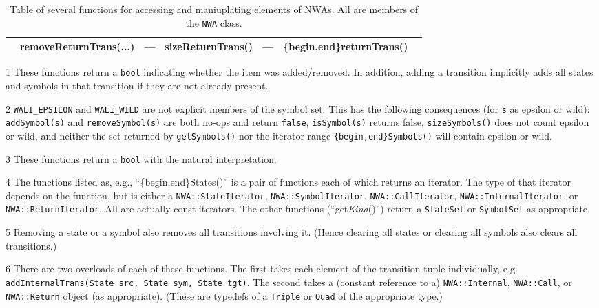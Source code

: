 \begin{sidewaystable}
\begin{threeparttable}
\begin{tabular}{p{0.75in}p{1.55in}p{1.6in}p{1.35in}p{1.27in}p{1.2in}p{1.5in}}
                                                            &  removeReturnTrans(\phantom{.}...\tnote{6}\phantom{a})
                                                                                                        &  ---                       &  sizeReturnTrans()  &  ---                       &  \{begin,end\}returnTrans()\\
\hline
\end{tabular}
\begin{tablenotes}
  \item[1] These functions return a \texttt{bool} indicating whether the item
    was added/removed. In addition, adding a transition implicitly adds all
    states and symbols in that transition if they are not already present.
  \item[2] \texttt{WALI\_EPSILON} and \texttt{WALI\_WILD} are not explicit
    members of the symbol set. This has the following consequences (for
    \texttt{s} as epsilon or wild): \texttt{addSymbol(s)} and
    \texttt{removeSymbol(s)} are both no-ops and return \texttt{false},
    \texttt{isSymbol(s)} returns false, \texttt{sizeSymbols()} does not count
    epsilon or wild, and neither the set returned by \texttt{getSymbols()}
    nor the iterator range \texttt{\{begin,end\}Symbols()} will contain
    epsilon or wild.
  \item[3] These functions return a \texttt{bool} with the natural
    interpretation.
  \item[4] The functions listed as, e.g., ``\{begin,end\}States()'' is a pair
    of functions each of which returns an iterator. The type of that iterator
    depends on the function, but is either a \texttt{NWA::StateIterator},
    \texttt{NWA::SymbolIterator}, \texttt{NWA::CallIterator},
    \texttt{NWA::InternalIterator}, or \texttt{NWA::ReturnIterator}. All are
    actually const iterators. The other functions (``get\textsl{Kind}()'')
    return a \texttt{StateSet} or \texttt{SymbolSet} as appropriate.
  \item[5] Removing a state or a symbol also removes all transitions
    involving it. (Hence clearing all states or clearing all symbols also
    clears all transitions.)
  \item[6] There are two overloads of each of these functions. The first
    takes each element of the transition tuple individually,
    e.g. \texttt{addInternalTrans(State src, State sym, State tgt)}. The
    second takes a (constant reference to a) \texttt{NWA::Internal},
    \texttt{NWA::Call}, or \texttt{NWA::Return} object (as
    appropriate). (These are typedefs of a \texttt{Triple} or \texttt{Quad}
    of the appropriate type.)
\end{tablenotes}
\caption{Table of several functions for accessing and maniuplating elements
  of NWAs. All are members of the \texttt{NWA} class. }
\label{Ta:simple-functions}
\end{threeparttable}
\end{sidewaystable}
\restoregeometry

